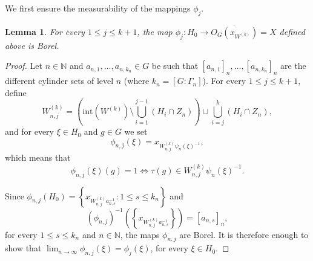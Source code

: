 \documentclass[titlepage,reqno,10pt]{amsart}
\newtheorem{lemma}[theorem]{Lemma}
\theoremstyle{definition}
\def\N{{\mathbb N}}
\newcommand{\kl}{\left(}
\newcommand{\kr}{\right)}
\begin{document}
We first ensure the measurability of the mappings $\phi_j$. 
\begin{lemma}\label{Borel_map}
For every $1\leq j\leq k+1$, the map $\phi_j:H_0\to \overline{O_G(x_{W^{(k)}})}=X$ defined above 
is Borel.
\end{lemma}
\begin{proof}
Let $n\in\N$ and $a_{n,1},\ldots, a_{n,k_n}\in G$ be such that $[a_{n,1}]_n,\ldots, [a_{n,k_n}]_{n}$  are  the different cylinder sets of level $n$ (where $k_n=[G:\Gamma_n]$). For every $1\leq j\leq k+1$, define 
$$W_{n,j}^{(k)}=\kl\mathrm{int}(W^{(k)})\setminus\bigcup_{i=1}^{j-1} (H_i \cap Z_n)\kr\cup \bigcup_{i=j}^k\left(H_i\cap Z_n\right),$$
and for every $\xi\in H_0$ and $g\in G$ we set $$\phi_{n,j}(\xi) = x_{W_{n,j}^{(k)}\psi_n(\xi)^{-1}},$$ which means that 
$$\phi_{n,j}(\xi)(g) = 1 \iff \tau(g) \in W_{n,j}^{(k)}\psi_n(\xi)^{-1}.$$

Since  $\phi_{n,j}(H_0)=\left\{x_{W_{n,j}^{(k)}a_{n,s}^{-1}}: 1\leq s\leq k_n\right\}$ and
$$(\phi_{n,j})^{-1}\left(\left\{x_{W_{n,j}^{(k)}a_{n,s}^{-1}}\right\}\right)=[a_{n,s}]_n,$$ for every $1\leq s\leq k_n$ and $n\in \N$, the maps $\phi_{n,j}$ are Borel.
It is therefore enough to show that $\lim_{n\to \infty}\phi_{n,j}(\xi)=\phi_j(\xi)$, for every $\xi\in H_0$. 


\end{proof}
\end{document}

